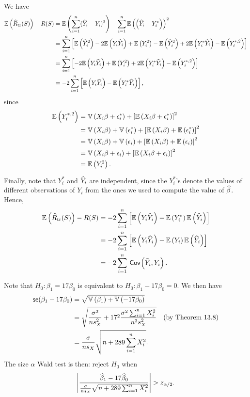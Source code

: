 \begin{ex}
  We have
  \begin{align*}
    \mathbb{E}\left(\widehat{R}_\text{tr}(S)\right)-R(S)
     & =\mathbb{E}\left(\sum_{i=1}^n(\widehat{Y}_i-Y_i)^2\right)-\sum_{i=1}^n\mathbb{E}\left(\left(\widehat{Y}_i-Y_i^*\right)\right)^2 \\
     & =\sum_{i=1}^n\left[\mathbb{E}\left(\widehat{Y}_i^2\right)-2\mathbb{E}\left(Y_i\widehat{Y}_i\right)+\mathbb{E}\left(Y_i^2\right)
    -\mathbb{E}\left(\widehat{Y}_i^2\right)+2\mathbb{E}\left(Y_i^*\widehat{Y}_i\right)-\mathbb{E}\left(Y_i^{*,2}\right)\right]                            \\
     & =\sum_{i=1}^n\left[-2\mathbb{E}\left(Y_i\widehat{Y}_i\right)+\mathbb{E}\left(Y_i^2\right)
    +2\mathbb{E}\left(Y_i^*\widehat{Y}_i\right)-\mathbb{E}\left(Y_i^{*,2}\right)\right]                                          \\
     & =-2\sum_{i=1}^n\left[\mathbb{E}\left(Y_i\widehat{Y}_i\right)-\mathbb{E}\left(Y_i^*\widehat{Y}_i\right)\right],
  \end{align*}
  since
  \begin{align*}
    \mathbb{E}\left(Y_i^{*,2}\right)
     & =\mathbb{V}\left(X_i\beta+\epsilon_i^*\right)+\left[\mathbb{E}\left(X_i\beta+\epsilon_i^*\right)\right]^2           \\
     & =\mathbb{V}\left(X_i\beta\right)+\mathbb{V}\left(\epsilon_i^*\right)+\left[\mathbb{E}\left(X_i\beta\right)+\mathbb{E}\left(\epsilon_i^*\right)\right]^2 \\
     & =\mathbb{V}\left(X_i\beta\right)+\mathbb{V}\left(\epsilon_i\right)+\left[\mathbb{E}\left(X_i\beta\right)+\mathbb{E}\left(\epsilon_i\right)\right]^2     \\
     & =\mathbb{V}\left(X_i\beta + \epsilon_i\right)+\left[\mathbb{E}\left(X_i\beta + \epsilon_i\right)\right]^2           \\
     & =\mathbb{E}\left(Y_i^2\right).
  \end{align*}

  Finally, note that $Y_i^*$ and $\widehat{Y}_i$ are independent, since the $Y_i^*$'s
  denote the values of different observations of $Y_i$ from the ones we used to
  compute the value of $\widehat{\beta}$. Hence,
  \begin{align*}
    \mathbb{E}\left(\widehat{R}_\text{tr}(S)\right)-R(S)
     & =-2\sum_{i=1}^n\left[\mathbb{E}\left(Y_i\widehat{Y}_i\right)-\mathbb{E}\left(Y_i^*\right)\mathbb{E}\left(\widehat{Y}_i\right)\right] \\
     & =-2\sum_{i=1}^n\left[\mathbb{E}\left(Y_i\widehat{Y}_i\right)-\mathbb{E}\left(Y_i\right)\mathbb{E}\left(\widehat{Y}_i\right)\right]   \\
     & =-2\sum_{i=1}^n\,\textsf{Cov}\mkern-2mu\left(\widehat{Y}_i, Y_i \right).
  \end{align*}
\end{ex}

\begin{ex}
  Note that $H_0:\beta_1=17\beta_0$ is equivalent to $H_0:\beta_1-17\beta_0=0$.
  We then have
  \begin{align*}
    \textsf{se}(\beta_1-17\beta_0)
     & =\sqrt{\mathbb{V}\left(\beta_1\right)+\mathbb{V}\left(-17\beta_0\right)}                                                                    \\
     & =\sqrt{\frac{\sigma^2}{ns^2_X}+17^2\frac{\sigma^2\sum_{i=1}^nX_i^2}{n^2s^2_X}} & (\text{by Theorem 13.8}) \\
     & =\frac{\sigma}{ns_X}\sqrt{n+289\sum_{i=1}^nX_i^2}.
  \end{align*}
  The size $\alpha$ Wald test is then: reject $H_0$ when
  \[
    \left|\frac{\widehat{\beta}_1-17\widehat{\beta}_0}{\frac{\sigma}{ns_X}\sqrt{n+289\sum_{i=1}^nX_i^2}}\right|
    >z_{\alpha/2}.
  \]
\end{ex}

